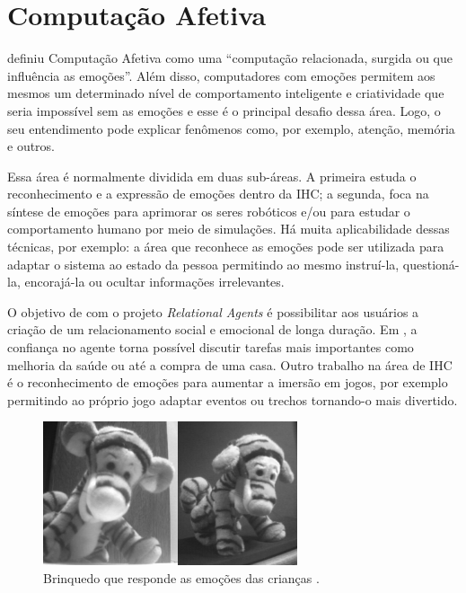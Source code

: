 \section{Computação Afetiva}

\citet{Pic98} definiu Computação Afetiva como uma ``computação relacionada,
surgida ou que influência as emoções''. Além disso, computadores com emoções
permitem aos mesmos um determinado nível de comportamento inteligente e
criatividade que seria impossível sem as emoções e esse é o principal desafio
dessa área. Logo, o seu entendimento pode explicar fenômenos como, por
exemplo, atenção, memória e outros.

Essa área é normalmente dividida em duas sub-áreas. A primeira estuda o
reconhecimento e a expressão de emoções dentro da IHC;
a segunda, foca na síntese de emoções para aprimorar os seres robóticos e/ou
para estudar o comportamento humano por meio de simulações. Há muita
aplicabilidade dessas técnicas, por exemplo: a área que reconhece as emoções
pode ser utilizada para adaptar o sistema ao estado da pessoa permitindo ao
mesmo instruí-la, questioná-la, encorajá-la ou ocultar informações irrelevantes.

O objetivo de \citet{bick2003relational} com o projeto \emph{Relational
Agents} é possibilitar aos usuários a criação de um relacionamento social e
emocional de longa duração.  Em \citet{bickmore2009virtual}, a confiança no
agente torna possível discutir tarefas mais importantes como melhoria da saúde
ou até a compra de uma casa. Outro trabalho na área de IHC é o reconhecimento
de emoções para aumentar a imersão em jogos, por exemplo permitindo ao próprio
jogo adaptar eventos ou trechos tornando-o mais divertido.

\begin{figure}
  \begin{center}
    \includegraphics[width=75mm]{figuras/tigger-mit.png}
  \end{center}
  \caption[Brinquedo que responde as emoções das crianças.]{Brinquedo que responde as emoções das crianças \cite{kirsch1999affective}.}
  \label{fig:tigger-mit}
\end{figure}

